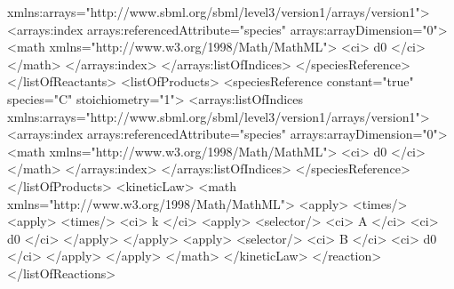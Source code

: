 \begin{example}
                    xmlns:arrays="http://www.sbml.org/sbml/level3/version1/arrays/version1">
                    <arrays:index arrays:referencedAttribute="species" arrays:arrayDimension="0">
                        <math
                            xmlns="http://www.w3.org/1998/Math/MathML">
                            <ci> d0 </ci>
                        </math>
                    </arrays:index>
                </arrays:listOfIndices>
            </speciesReference>
        </listOfReactants>
        <listOfProducts>
            <speciesReference constant="true" species="C" stoichiometry="1">
                <arrays:listOfIndices
                    xmlns:arrays="http://www.sbml.org/sbml/level3/version1/arrays/version1">
                    <arrays:index arrays:referencedAttribute="species" arrays:arrayDimension="0">
                        <math xmlns="http://www.w3.org/1998/Math/MathML">
                            <ci> d0 </ci>
                        </math>
                    </arrays:index>
                </arrays:listOfIndices>
            </speciesReference>
        </listOfProducts>
        <kineticLaw>
            <math xmlns="http://www.w3.org/1998/Math/MathML">
                <apply>
                    <times/>
                    <apply>
                        <times/>
                        <ci> k </ci>
                        <apply>
                            <selector/>
                            <ci> A </ci>
                            <ci> d0 </ci>
                        </apply>
                    </apply>
                    <apply>
                        <selector/>
                        <ci> B </ci>
                        <ci> d0 </ci>
                    </apply>
                </apply>
            </math>
        </kineticLaw>
    </reaction>
</listOfReactions>
\end{example}



